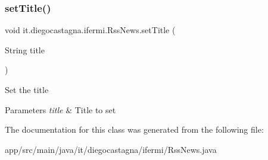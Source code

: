 \subsubsection{\texorpdfstring{setTitle()}{setTitle()}}
{\footnotesize\ttfamily void it.\+diegocastagna.\+ifermi.\+Rss\+News.\+set\+Title (\begin{DoxyParamCaption}\item[{String}]{title }\end{DoxyParamCaption})\hspace{0.3cm}{\ttfamily [inline]}}

Set the title 
\begin{DoxyParams}{Parameters}
{\em title} & Title to set \\
\hline
\end{DoxyParams}


The documentation for this class was generated from the following file\+:\begin{DoxyCompactItemize}
\item 
app/src/main/java/it/diegocastagna/ifermi/Rss\+News.\+java\end{DoxyCompactItemize}
